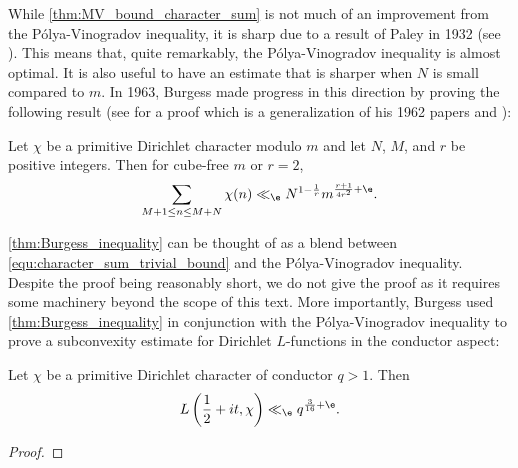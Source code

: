     While \cref{thm:MV_bound_character_sum} is not much of an improvement from the P\'olya-Vinogradov inequality, it is sharp due to a result of Paley in 1932 (see \cite{paley1932theorem}). This means that, quite remarkably, the P\'olya-Vinogradov inequality is almost optimal. It is also useful to have an estimate that is sharper when $N$ is small compared to $m$. In 1963, Burgess made progress in this direction by proving the following result (see \cite{burgess1963character} for a proof which is a generalization of his 1962 papers \cite{burgess1962characterL-series} and \cite{burgess1962characterprimitive}):

    \begin{theorem}\label{thm:Burgess_inequality}
      Let $\chi$ be a primitive Dirichlet character modulo $m$ and let $N$, $M$, and $r$ be positive integers. Then for cube-free $m$ or $r = 2$,
      \[
        \sum_{M+1 \le n \le M+N}\chi(n) \ll_{\e} N^{1-\frac{1}{r}}m^{\frac{r+1}{4r^{2}}+\e}.
      \]
    \end{theorem}

    \cref{thm:Burgess_inequality} can be thought of as a blend between \cref{equ:character_sum_trivial_bound} and the P\'olya-Vinogradov inequality. Despite the proof being reasonably short, we do not give the proof as it requires some machinery beyond the scope of this text. More importantly, Burgess used \cref{thm:Burgess_inequality} in conjunction with the P\'olya-Vinogradov inequality to prove a subconvexity estimate for Dirichlet $L$-functions in the conductor aspect:

    \begin{theorem}
      Let $\chi$ be a primitive Dirichlet character of conductor $q > 1$. Then
      \[
        L\left(\frac{1}{2}+it,\chi\right) \ll_{\e} q^{\frac{3}{16}+\e}. 
      \]
    \end{theorem}
    \begin{proof}
    \end{proof}